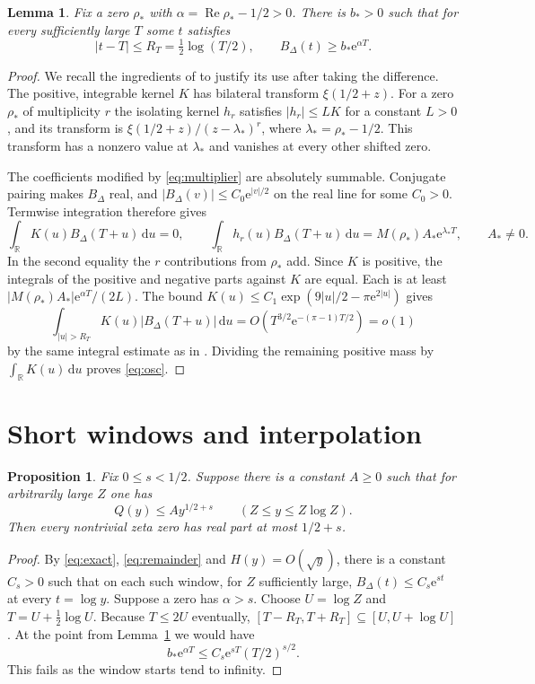 \documentclass[11pt,a4paper]{article}
\newtheorem{proposition}[theorem]{Proposition}
\newtheorem{lemma}[theorem]{Lemma}
\newcommand{\e}{\mathrm e}
\newcommand{\Rea}{\operatorname{Re}}
\newcommand{\dd}{\,\mathrm d}
\begin{document}
\begin{lemma}\label{lem:osc}
Fix a zero \(\rho_*\) with \(\alpha=\Rea\rho_*-1/2>0\).
There is \(b_*>0\) such that for every sufficiently large \(T\)
some \(t\) satisfies
\begin{equation}\label{eq:osc}
 |t-T|\le R_T=\tfrac12\log(T/2),\qquad B_\Delta(t)\ge b_*\e^{\alpha T}.
\end{equation}
\end{lemma}
\begin{proof}
We recall the ingredients of \cite[Lemma~2.1]{windows} to justify its
use after taking the difference. The positive, integrable kernel \(K\)
has bilateral transform \(\xi(1/2+z)\). For a zero \(\rho_*\) of
multiplicity \(r\) the isolating kernel \(h_r\) satisfies
\(|h_r|\le LK\) for a constant \(L>0\), and its transform is
\(\xi(1/2+z)/(z-\lambda_*)^r\), where \(\lambda_*=\rho_*-1/2\).
This transform has a nonzero value at \(\lambda_*\) and vanishes at
every other shifted zero.

The coefficients modified by \eqref{eq:multiplier} are absolutely summable. Conjugate pairing
makes \(B_\Delta\) real, and \(|B_\Delta(v)|\le C_0\e^{|v|/2}\)
on the real line for some \(C_0>0\). Termwise integration therefore
gives
\[
 \int_{\mathbb R} K(u)B_\Delta(T+u)\dd u=0,\qquad
 \int_{\mathbb R} h_r(u)B_\Delta(T+u)\dd u
    =M(\rho_*)A_*\e^{\lambda_*T},\qquad A_*\ne0 .
\]
In the second equality the \(r\) contributions from \(\rho_*\) add.
Since \(K\) is positive, the integrals of the positive and negative
parts against \(K\) are equal. Each is at least
\(|M(\rho_*)A_*|\e^{\alpha T}/(2L)\).
The bound \(K(u)\le C_1\exp(9|u|/2-\pi\e^{2|u|})\) gives
\[
 \int_{|u|>R_T}K(u)|B_\Delta(T+u)|\dd u
 =O\!\left(T^{3/2}\e^{-(\pi-1)T/2}\right)=o(1)
\]
by the same integral estimate as in \cite{windows}. Dividing the
remaining positive mass by \(\int_{\mathbb R}K(u)\dd u\) proves
\eqref{eq:osc}.
\end{proof}

\section{Short windows and interpolation}

\begin{proposition}\label{prop:windows}
Fix \(0\le s<1/2\). Suppose there is a constant \(A\ge0\) such that
for arbitrarily large \(Z\) one has
\[
 Q(y)\le A y^{1/2+s}\qquad(Z\le y\le Z\log Z).
\]
Then every nontrivial zeta zero has real part at most \(1/2+s\).
\end{proposition}
\begin{proof}
By \eqref{eq:exact}, \eqref{eq:remainder} and \(H(y)=O(\sqrt y)\),
there is a constant \(C_s>0\) such that on each such window,
for \(Z\) sufficiently large, \(B_\Delta(t)\le C_s\e^{st}\)
at every \(t=\log y\). Suppose a zero has \(\alpha>s\).
Choose \(U=\log Z\) and \(T=U+\frac12\log U\). Because \(T\le2U\)
eventually, \([T-R_T,T+R_T]\subseteq[U,U+\log U]\).
At the point from Lemma~\ref{lem:osc} we would have
\[
 b_*\e^{\alpha T}\le C_s\e^{sT}(T/2)^{s/2}.
\]
This fails as the window starts tend to infinity.
\end{proof}
\end{document}
